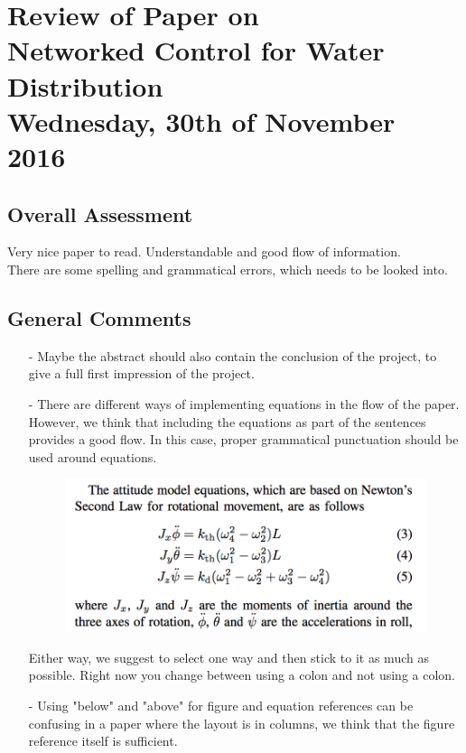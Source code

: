
\renewcommand{\vec}[1]{\boldsymbol{\mathbf{#1}}}

\renewcommand\chaptername{KAPITEL}
\renewcommand\contentsname{Indhold}
\renewcommand\figurename{Figur}
\renewcommand\tablename{Tabel}

\section*{Review of Paper on\\
Networked Control for Water Distribution\\
\small Wednesday, 30th of November 2016}
\subsection{Overall Assessment}
Very nice paper to read. Understandable and good flow of information. \\
There are some spelling and grammatical errors, which needs to be looked into.  
\subsection{General Comments}
\begin{itemize}
	\item[-] Maybe the abstract should also contain the conclusion of the project, to give a full first impression of the project.
	\item[-]There are different ways of implementing equations in the flow of the paper. However, we think that including the equations as part of the sentences provides a good flow. In this case, proper grammatical punctuation should be used around equations.\\
\begin{figure}[H]
    \centering
    \includegraphics[width=.4\textwidth]{equation.PNG}
\end{figure}
Either way, we suggest to select one way and then stick to it as much as possible. Right now you change between using a colon and not using a colon. 
\item[-]Using "below" and "above" for figure and equation references can be confusing in a paper where the layout is in columns, we think that the figure reference itself is sufficient.
\end{itemize}	
